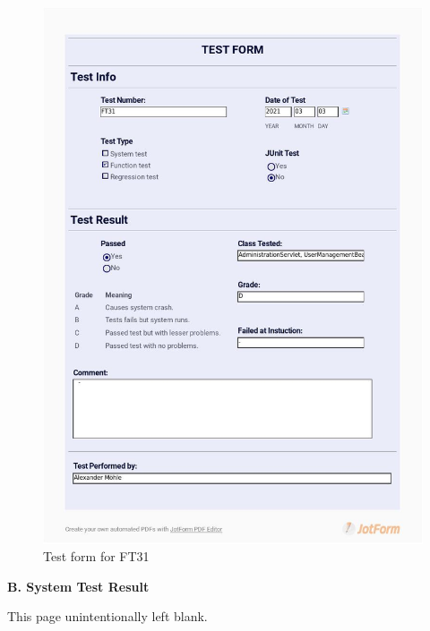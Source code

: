 \documentclass{article}
\begin{document}
 \begin{figure}
     \centering
     \includegraphics[width=13cm]{images/2021-03-03_Alexander_FT31_001}
     \renewcommand\figurename{Figure}
     \caption{Test form for FT31}
     \label{fig:my_label}
 \end{figure}


\newpage
\begin{flushleft}
{\large \textbf{B. System Test Result}}
\end{flushleft}

\vspace*{\fill}
                \hfill
                \begin{center}
                This page unintentionally left blank.
                \end{center}
                \vspace{\fill}
                \thispagestyle{empty}
\end{document}
